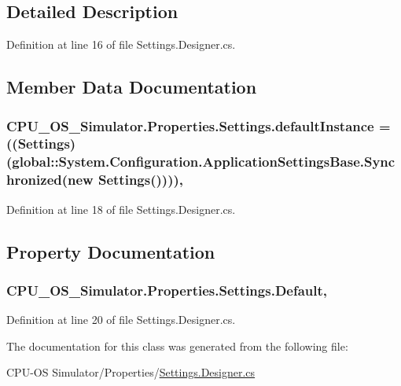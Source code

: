 \subsection{Detailed Description}


Definition at line 16 of file Settings.\+Designer.\+cs.



\subsection{Member Data Documentation}
\hypertarget{class_c_p_u___o_s___simulator_1_1_properties_1_1_settings_a9016562ea46f792bf8dc8d3e79dd36ae}{}
\subsubsection[{default\+Instance}]{ C\+P\+U\+\_\+\+O\+S\+\_\+\+Simulator.\+Properties.\+Settings.\+default\+Instance = (({\bf Settings})(global\+::\+System.\+Configuration.\+Application\+Settings\+Base.\+Synchronized(new {\bf Settings}())))\hspace{0.3cm}{\ttfamily [static]}, {\ttfamily [private]}}\label{class_c_p_u___o_s___simulator_1_1_properties_1_1_settings_a9016562ea46f792bf8dc8d3e79dd36ae}


Definition at line 18 of file Settings.\+Designer.\+cs.



\subsection{Property Documentation}
\hypertarget{class_c_p_u___o_s___simulator_1_1_properties_1_1_settings_a423993327c18a4dfede5f73981018fca}{}
\subsubsection[{Default}]{ C\+P\+U\+\_\+\+O\+S\+\_\+\+Simulator.\+Properties.\+Settings.\+Default\hspace{0.3cm}{\ttfamily [static]}, {\ttfamily [get]}}\label{class_c_p_u___o_s___simulator_1_1_properties_1_1_settings_a423993327c18a4dfede5f73981018fca}


Definition at line 20 of file Settings.\+Designer.\+cs.



The documentation for this class was generated from the following file\+:\begin{DoxyCompactItemize}
\item 
C\+P\+U-\/\+O\+S Simulator/\+Properties/\hyperlink{_settings_8_designer_8cs}{Settings.\+Designer.\+cs}\end{DoxyCompactItemize}
